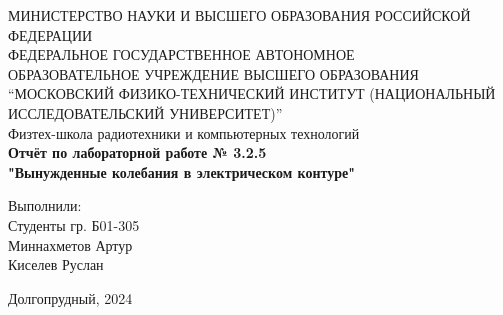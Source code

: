 \begin{center}
МИНИСТЕРСТВО НАУКИ И ВЫСШЕГО ОБРАЗОВАНИЯ РОССИЙСКОЙ ФЕДЕРАЦИИ\\
\hfill \break
ФЕДЕРАЛЬНОЕ ГОСУДАРСТВЕННОЕ АВТОНОМНОЕ \\ ОБРАЗОВАТЕЛЬНОЕ УЧРЕЖДЕНИЕ ВЫСШЕГО ОБРАЗОВАНИЯ \\
“МОСКОВСКИЙ ФИЗИКО-ТЕХНИЧЕСКИЙ ИНСТИТУТ (НАЦИОНАЛЬНЫЙ ИССЛЕДОВАТЕЛЬСКИЙ УНИВЕРСИТЕТ)” \\

\hfill \break
Физтех-школа радиотехники и компьютерных технологий\\
\vspace{2.5cm}
\large{\textbf{Отчёт по лабораторной работе № 3.2.5}}\\
\large{\textbf{"Вынужденные колебания в электрическом контуре"}}\\
\hfill \break
\end{center}

\vspace{5cm}

\begin{flushright}
Выполнили:\\
Студенты гр. Б01-305\\
Миннахметов Артур\\
Киселев Руслан\\
\end{flushright}

\vfill


\begin{center} Долгопрудный, 2024 \end{center}

\thispagestyle{empty}
\newpage
